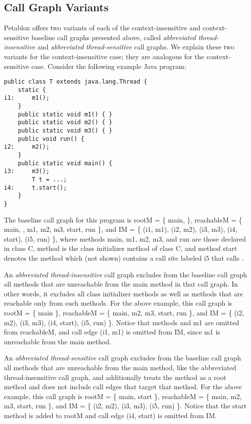 \subsection{Call Graph Variants}

Petablox offers two variants of each of the context-insensitive and
context-sensitive baseline call graphs presented above, called {\it abbreviated
thread-insensitive} and {\it abbreviated thread-sensitive} call graphs.  We
explain these two variants for the context-insensitive case; they are analogous
for the context-sensitive case.  Consider the following example Java program:

\begin{framed}
\begin{verbatim}
public class T extends java.lang.Thread {
    static {
i1:     m1();
    }
    public static void m1() { }
    public static void m2() { }
    public static void m3() { }
    public void run() {
i2:     m2();
    }
    public static void main() {
i3:     m3();
        T t = ...;
i4:     t.start();
    }
}
\end{verbatim}
\end{framed}

The baseline call graph for this program is 
rootM = \{ main,  \}, 
reachableM = \{ main, , m1, m2, m3, start, run \}, and
IM = \{ (i1, m1), (i2, m2), (i3, m3), (i4, start), (i5, run) \}, where methods
main, m1, m2, m3, and run are those declared in class C, method 
is the class initializer method of class C, and method start denotes the
 method which (not shown) contains a call site labeled i5 that calls
.

An {\it abbreviated thread-insensitive} call graph excludes from the baseline call
graph all methods that are unreachable from the main method in that call graph.  In other words, it
excludes all class initializer methods as well as methods that are reachable
only from such methods.
For the above example, this call graph is
rootM = \{ main \},
reachableM = \{ main, m2, m3, start, run \}, and
IM = \{ (i2, m2), (i3, m3), (i4, start), (i5, run) \}.  Notice that methods
 and m1 are omitted from reachableM, and call edge (i1, m1) is
omitted from IM, since m1 is unreachable from the main method.

An {\it abbreviated thread-sensitive} call graph excludes from the baseline call
graph all methods that are unreachable from the main method, like the
abbreviated thread-insensitive call graph, and additionally treats the
 method as a root method and does not include
call edges that target that method.
For the above example, this call graph is
rootM = \{ main, start \},
reachableM = \{ main, m2, m3, start, run \}, and
IM = \{ (i2, m2), (i3, m3), (i5, run) \}.  Notice that the start method is
added to rootM and call edge (i4, start) is omitted from IM.

